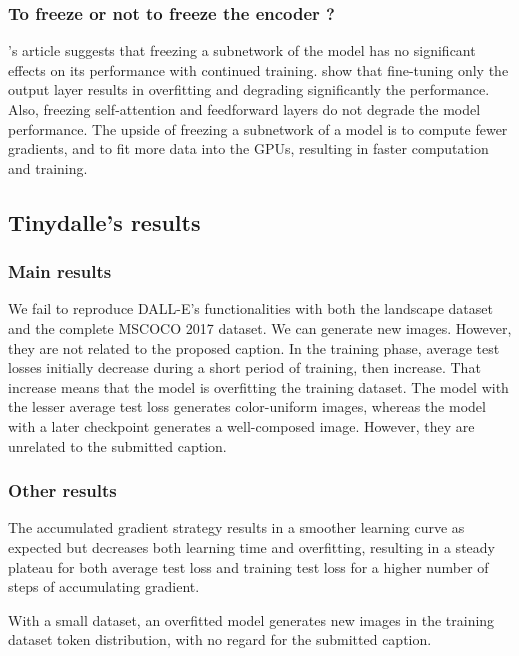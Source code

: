 \documentclass{article}
\begin{document}
\subsubsection{To freeze or not to freeze the encoder ?}

\cite{Thompson_2018}'s article suggests that freezing a subnetwork of the model has no significant effects on its performance with continued training. \cite{https://doi.org/10.48550/arxiv.2103.05247} show that fine-tuning only the output layer results in overfitting and degrading significantly the performance. Also, freezing self-attention and feedforward layers do not degrade the model performance.
The upside of freezing a subnetwork of a model is to compute fewer gradients, and to fit more data into the GPUs, resulting in faster computation and training.


\subsection{Tinydalle's results}\label{subsec:tinydalle_results}

\subsubsection{Main results}

We fail to reproduce DALL-E's functionalities with both the landscape dataset and the complete MSCOCO 2017 dataset. We can generate new images. However, they are not related to the proposed caption. In the training phase, average test losses initially decrease during a short period of training, then increase. That increase means that the model is overfitting the training dataset. The model with the lesser average test loss generates color-uniform images, whereas the model with a later checkpoint generates a well-composed image. However, they are unrelated to the submitted caption.

\subsubsection{Other results}

The accumulated gradient strategy results in a smoother learning curve as expected but decreases both learning time and overfitting, resulting in a steady plateau for both average test loss and training test loss for a higher number of steps of accumulating gradient.

With a small dataset, an overfitted model generates new images in the training dataset token distribution, with no regard for the submitted caption.
\end{document}
